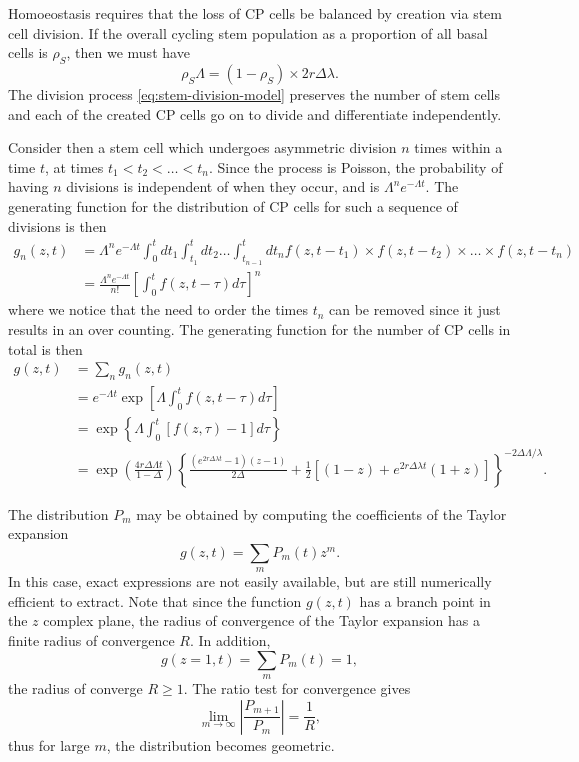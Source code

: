 \documentclass[10pt,UKenglish]{article}
\begin{document}
Homoeostasis requires that the loss of CP cells be balanced by creation via stem cell division. If the overall cycling stem population as a proportion of all basal cells is $\rho_S$, then we must have $$\rho_S \Lambda = (1-\rho_S) \times 2 r \Delta \lambda.$$ The division process \ref{eq:stem-division-model} preserves the number of stem cells and each of the created CP cells go on to divide and differentiate independently.

Consider then a stem cell which undergoes asymmetric division $n$ times within a time $t$, at times $t_1 < t_2 < \ldots < t_n$. Since the process is Poisson, the probability of having $n$ divisions is independent of when they occur, and is $\Lambda^n e^{-\Lambda t}$. The generating function for the distribution of CP cells for such a sequence of divisions is then
\begin{align*}
g_n(z,t) &= \Lambda^n e^{-\Lambda t} \int_0^t dt_1 \int_{t_1}^t dt_2 \ldots \int_{t_{n-1}}^t dt_n f(z,t-t_1) \times f(z,t-t_2) \times \ldots \times f(z,t-t_n) \\
 &= \frac{\Lambda^n e^{-\Lambda t}}{n!} \left[\int_0^t f(z,t-\tau) d\tau \right]^n
\end{align*}
where we notice that the need to order the times $t_n$ can be removed since it just results in an over counting. The generating function for the number of CP cells in total is then
\begin{align*}
g(z,t) &= \sum_n g_n(z,t) \\
 &= e^{-\Lambda t} \exp\left[\Lambda \int_0^t f(z,t-\tau) d\tau \right] \\
 &= \exp\left\{\Lambda \int_0^t \left[f(z,\tau) - 1\right] d\tau \right\} \\
 &= \exp\left(\frac{4 r \Delta \Lambda t}{1-\Delta}\right) \left\{ \frac{\left(e^{2 r \Delta \lambda t}-1 \right)(z-1)}{2\Delta} + \frac{1}{2}\left[(1-z) + e^{2 r \Delta \lambda t}(1+z) \right]\right\}^{-2\Delta\Lambda/\lambda}.
\end{align*}

The distribution $P_m$ may be obtained by computing the coefficients of the Taylor expansion $$g(z,t) = \sum_m P_m(t) z^m.$$ In this case, exact expressions are not easily available, but are still numerically efficient to extract. Note that since the function $g(z,t)$ has a branch point in the $z$ complex plane, the radius of convergence of the Taylor expansion has a finite radius of convergence $R$. In addition, $$g(z=1,t) = \sum_m P_m(t) = 1,$$ the radius of converge $R \ge 1$. The ratio test for convergence gives $$\lim_{m\rightarrow \infty} \left| \frac{P_{m+1}}{P_m} \right| = \frac{1}{R},$$ thus for large $m$, the distribution becomes geometric.
\end{document}
